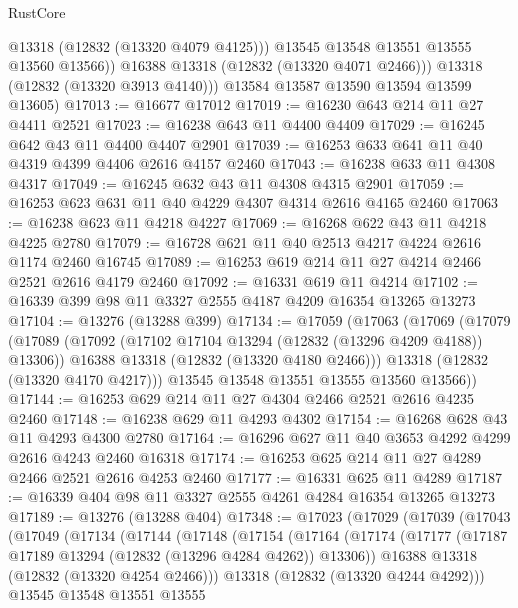 \begin{lexlean}{RustCore}
\begin{coremodule}
                @13318
                (@12832 (@13320 @4079 @4125)))
              @13545
              @13548
              @13551
              @13555
              @13560
              @13566))
          @16388
          @13318
          (@12832 (@13320 @4071 @2466)))
        @13318
        (@12832 (@13320 @3913 @4140)))
      @13584
      @13587
      @13590
      @13594
      @13599
      @13605)
@17013 := @16677 @17012
@17019 := @16230 @643 @214 @11 @27 @4411 @2521
@17023 := @16238 @643 @11 @4400 @4409
@17029 := @16245 @642 @43 @11 @4400 @4407 @2901
@17039 := @16253 @633 @641 @11 @40 @4319 @4399 @4406 @2616 @4157 @2460
@17043 := @16238 @633 @11 @4308 @4317
@17049 := @16245 @632 @43 @11 @4308 @4315 @2901
@17059 := @16253 @623 @631 @11 @40 @4229 @4307 @4314 @2616 @4165 @2460
@17063 := @16238 @623 @11 @4218 @4227
@17069 := @16268 @622 @43 @11 @4218 @4225 @2780
@17079 := @16728 @621 @11 @40 @2513 @4217 @4224 @2616 @1174 @2460 @16745
@17089 := @16253 @619 @214 @11 @27 @4214 @2466 @2521 @2616 @4179 @2460
@17092 := @16331 @619 @11 @4214
@17102 := @16339 @399 @98 @11 @3327 @2555 @4187 @4209 @16354 @13265 @13273
@17104 := @13276 (@13288 @399)
@17134 := @17059
    (@17063
      (@17069
        (@17079
          (@17089
            (@17092 (@17102 @17104 @13294 (@12832 (@13296 @4209 @4188)) @13306))
            @16388
            @13318
            (@12832 (@13320 @4180 @2466)))
          @13318
          (@12832 (@13320 @4170 @4217)))
        @13545
        @13548
        @13551
        @13555
        @13560
        @13566))
@17144 := @16253 @629 @214 @11 @27 @4304 @2466 @2521 @2616 @4235 @2460
@17148 := @16238 @629 @11 @4293 @4302
@17154 := @16268 @628 @43 @11 @4293 @4300 @2780
@17164 := @16296 @627 @11 @40 @3653 @4292 @4299 @2616 @4243 @2460 @16318
@17174 := @16253 @625 @214 @11 @27 @4289 @2466 @2521 @2616 @4253 @2460
@17177 := @16331 @625 @11 @4289
@17187 := @16339 @404 @98 @11 @3327 @2555 @4261 @4284 @16354 @13265 @13273
@17189 := @13276 (@13288 @404)
@17348 := @17023
    (@17029
      (@17039
        (@17043
          (@17049
            (@17134
              (@17144
                (@17148
                  (@17154
                    (@17164
                      (@17174
                        (@17177 (@17187 @17189 @13294 (@12832 (@13296 @4284 @4262)) @13306))
                        @16388
                        @13318
                        (@12832 (@13320 @4254 @2466)))
                      @13318
                      (@12832 (@13320 @4244 @4292)))
                    @13545
                    @13548
                    @13551
                    @13555

\end{coremodule}
\end{lexlean}
